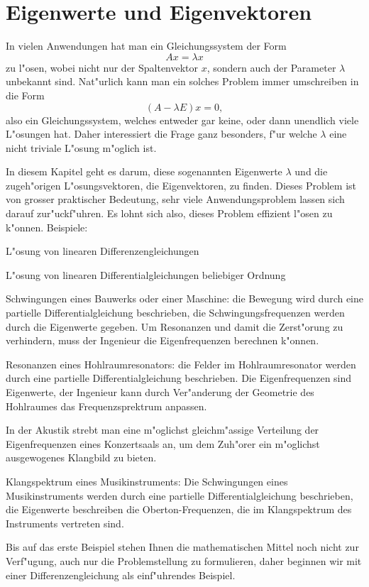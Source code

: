 \chapter{Eigenwerte und Eigenvektoren\label{chapter-eigen}}
In vielen Anwendungen hat man ein Gleichungssystem der Form
$$Ax=\lambda x$$
zu l"osen, wobei nicht nur der Spaltenvektor $x$, sondern auch der
Parameter $\lambda$ unbekannt sind. Nat"urlich kann man ein solches
Problem immer umschreiben in die Form
$$(A-\lambda E) x=0,$$
also ein Gleichungssystem, welches entweder gar keine, oder dann
unendlich viele L"osungen hat. Daher interessiert die Frage 
ganz besonders, f"ur welche $\lambda$ eine nicht triviale L"osung m"oglich ist.

In diesem Kapitel geht es darum, diese sogenannten Eigenwerte $\lambda$
und die zugeh"origen L"osungsvektoren, die Eigenvektoren, zu finden. Dieses
Problem ist von grosser praktischer Bedeutung, sehr viele Anwendungsproblem
lassen sich darauf zur"uckf"uhren. Es lohnt sich also, dieses Problem
effizient l"osen zu k"onnen. Beispiele:
\begin{compactitem}
\item L"osung von linearen Differenzengleichungen
\item L"osung von linearen Differentialgleichungen beliebiger Ordnung
\item Schwingungen eines Bauwerks oder einer Maschine: die Bewegung wird durch
eine partielle Differentialgleichung beschrieben, die Schwingungsfrequenzen
werden durch die Eigenwerte gegeben. Um Resonanzen und damit die Zerst"orung
zu verhindern, muss der Ingenieur die Eigenfrequenzen
berechnen k"onnen.
\item Resonanzen eines Hohlraumresonators: die Felder im Hohlraumresonator
werden durch eine partielle Differentialgleichung beschrieben.
Die Eigenfrequenzen sind Eigenwerte, der Ingenieur kann durch Ver"anderung
der Geometrie des Hohlraumes das Frequenzsprektrum anpassen.
\item
{}
In der
Akustik strebt man eine m"oglichst gleichm"assige Verteilung der Eigenfrequenzen
eines Konzertsaals an, um dem Zuh"orer ein m"oglichst ausgewogenes Klangbild
zu bieten.
\item Klangspektrum eines Musikinstruments: Die Schwingungen eines Musikinstruments
werden durch eine partielle Differentialgleichung beschrieben, die
Eigenwerte beschreiben die Oberton-Frequenzen, die im Klangspektrum des
Instruments vertreten sind.
\end{compactitem}
Bis auf das erste Beispiel stehen Ihnen die mathematischen Mittel noch nicht
zur Verf"ugung, auch nur die Problemstellung zu formulieren, daher beginnen
wir mit einer Differenzengleichung als einf"uhrendes Beispiel.

